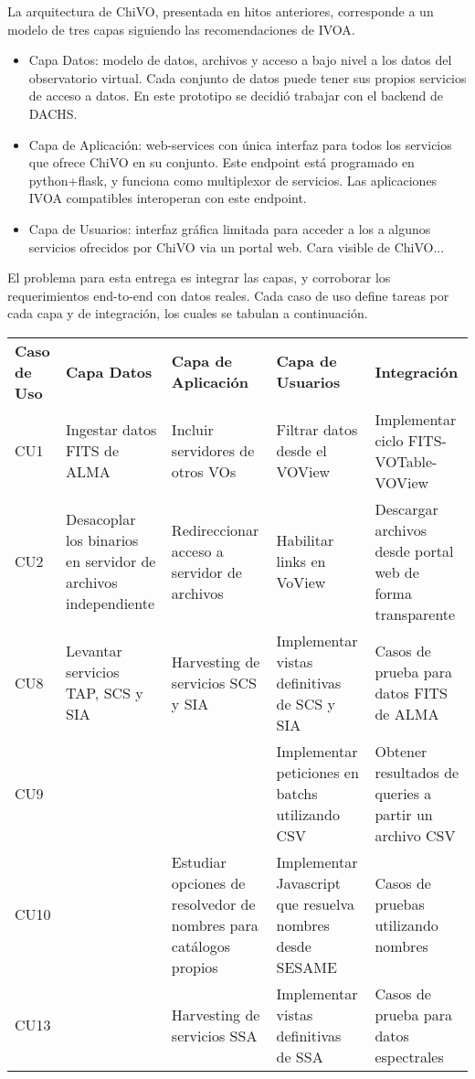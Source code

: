La arquitectura de ChiVO, presentada en hitos anteriores, corresponde
a un modelo de tres capas siguiendo las recomendaciones de IVOA.

\begin{itemize}
\item Capa Datos: modelo de datos, archivos y acceso a bajo nivel 
a los datos del observatorio virtual. Cada conjunto de datos puede
tener sus propios servicios de acceso a datos. En este prototipo
se decidió trabajar con el backend de DACHS.
\item Capa de Aplicación: web-services con única interfaz para todos
los servicios que ofrece ChiVO en su conjunto. Este endpoint está programado en
python+flask, y funciona como multiplexor de servicios. Las aplicaciones
IVOA compatibles interoperan con este endpoint.
\item Capa de Usuarios: interfaz gráfica limitada para acceder a los
a algunos servicios ofrecidos por ChiVO via un portal web. Cara visible
de ChiVO...
\end{itemize}

El problema para esta entrega es integrar las capas, y corroborar
los requerimientos end-to-end con datos reales. Cada caso de uso
define tareas por cada capa y de integración, los cuales se tabulan a continuación.
\begin{tabular}{l|l|l|l|l|}
\textbf{Caso de Uso} & \textbf{Capa Datos} &
\textbf{Capa de Aplicación} & \textbf{Capa de Usuarios} &
\textbf{Integración} \\
CU1 & Ingestar datos FITS de ALMA & Incluir servidores de otros VOs & Filtrar
datos desde el VOView & Implementar ciclo FITS-VOTable-VOView\\
CU2 & Desacoplar los binarios en servidor de archivos independiente &
Redireccionar acceso a servidor de archivos & Habilitar links en VoView &
Descargar archivos desde portal web de forma transparente\\
CU8 & Levantar servicios TAP, SCS y SIA & Harvesting de servicios SCS y SIA &
Implementar vistas definitivas de SCS y SIA & Casos de prueba para datos FITS de
ALMA \\
CU9 & & & 
Implementar peticiones en batchs utilizando CSV & Obtener resultados de queries a partir un
archivo CSV \\
CU10 & & Estudiar opciones de resolvedor de nombres para catálogos propios &
Implementar Javascript que resuelva nombres desde SESAME & Casos de pruebas
utilizando nombres \\
CU13 &  & Harvesting de servicios SSA &
Implementar vistas definitivas de SSA & Casos de prueba para datos espectrales \\
\end{tabular}





